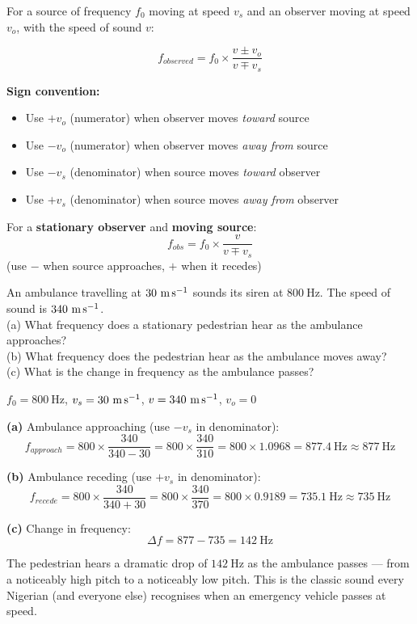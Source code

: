 \begin{lawbox}
For a source of frequency $f_0$ moving at speed $v_s$
and an observer moving at speed $v_o$, with the speed
of sound $v$:

\[
  f_{observed} = f_0 \times
  \frac{v \pm v_o}{v \mp v_s}
\]

\textbf{Sign convention:}
\begin{itemize}[noitemsep]
  \item Use $+v_o$ (numerator) when observer moves
  \textit{toward} source
  \item Use $-v_o$ (numerator) when observer moves
  \textit{away from} source
  \item Use $-v_s$ (denominator) when source moves
  \textit{toward} observer
  \item Use $+v_s$ (denominator) when source moves
  \textit{away from} observer
\end{itemize}

For a \textbf{stationary observer} and \textbf{moving
source}:
\[
  f_{obs} = f_0 \times \frac{v}{v \mp v_s}
\]
(use $-$ when source approaches, $+$ when it recedes)
\end{lawbox}

\begin{examplebox}[18.4]
An ambulance travelling at $30\ \text{m\,s}^{-1}$
sounds its siren at $800\ \text{Hz}$. The speed of
sound is $340\ \text{m\,s}^{-1}$.\\
(a) What frequency does a stationary pedestrian
hear as the ambulance approaches?\\
(b) What frequency does the pedestrian hear as the
ambulance moves away?\\
(c) What is the change in frequency as the
ambulance passes?
\end{examplebox}

\begin{solutionbox}
$f_0 = 800\ \text{Hz}$, $v_s = 30\ \text{m\,s}^{-1}$,
$v = 340\ \text{m\,s}^{-1}$, $v_o = 0$

\textbf{(a)} Ambulance approaching
(use $-v_s$ in denominator):
\[
  f_{approach} = 800 \times \frac{340}{340 - 30}
  = 800 \times \frac{340}{310}
  = 800 \times 1.0968
  = 877.4\ \text{Hz} \approx 877\ \text{Hz}
\]

\textbf{(b)} Ambulance receding
(use $+v_s$ in denominator):
\[
  f_{recede} = 800 \times \frac{340}{340 + 30}
  = 800 \times \frac{340}{370}
  = 800 \times 0.9189
  = 735.1\ \text{Hz} \approx 735\ \text{Hz}
\]

\textbf{(c)} Change in frequency:
\[
  \Delta f = 877 - 735 = 142\ \text{Hz}
\]

The pedestrian hears a dramatic drop of $142\ \text{Hz}$
as the ambulance passes --- from a noticeably high pitch
to a noticeably low pitch. This is the classic sound
every Nigerian (and everyone else) recognises when
an emergency vehicle passes at speed.
\end{solutionbox}

